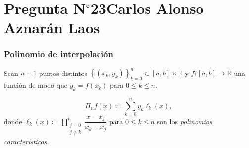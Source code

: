 \section{Pregunta N$^{\circ}$23\qquad Carlos Alonso Aznarán Laos}

\begin{frame}
	\frametitle{Polinomio de interpolación}

	Sean $n+1$ puntos distintos
	\begin{math}
		{
			\left\{
			\left(x_{k},y_{k}\right)
			\right\}
		}_{k=0}^{n}\subset
		\left[a,b\right]\times\mathbb{R}
	\end{math}
	y
	\begin{math}
		f\colon\left[a,b\right]\to
		\mathbb{R}
	\end{math}
	una función de modo que
	\begin{math}
		y_{k}=
		f\left(x_{k}\right)
	\end{math}
	para $0\leq k\leq n$.

	\begin{definition}
		\begin{equation*}
			\Pi_{n}
			f\left(x\right)\coloneqq
			\sum\limits_{k=0}^{n}
			y_{k}
			\ell_{k}\left(x\right),
		\end{equation*}
		donde
		\begin{math}
			\ell_{k}
			\left(x\right)\coloneq
			\prod\limits_{\substack{j=0\\j\neq k}}^{n}
			\dfrac{x-x_{j}}{x_{k}-x_{j}}
		\end{math}
		para $0\leq k\leq n$ son los \emph{polinomios característicos}.
	\end{definition}




\end{frame}
